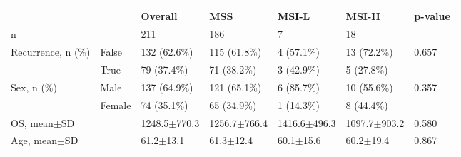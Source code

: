 \begin{tabular}{lllllll}
\hline
& & Overall & MSS & MSI-L & MSI-H & p-value \\
\hline
 n & & 211 & 186 & 7 & 18 & \\
 Recurrence, n (\%) & False & 132 (62.6\%) & 115 (61.8\%) & 4 (57.1\%) & 13 (72.2\%) & 0.657 \\
 & True & 79 (37.4\%) & 71 (38.2\%) & 3 (42.9\%) & 5 (27.8\%) & \\
 Sex, n (\%) & Male & 137 (64.9\%) & 121 (65.1\%) & 6 (85.7\%) & 10 (55.6\%) & 0.357 \\
 & Female & 74 (35.1\%) & 65 (34.9\%) & 1 (14.3\%) & 8 (44.4\%) & \\
 OS, mean$\pm$SD & & 1248.5$\pm$770.3 & 1256.7$\pm$766.4 & 1416.6$\pm$496.3 & 1097.7$\pm$903.2 & 0.580 \\
 Age, mean$\pm$SD & & 61.2$\pm$13.1 & 61.3$\pm$12.4 & 60.1$\pm$15.6 & 60.2$\pm$19.4 & 0.867 \\
\hline
\end{tabular}